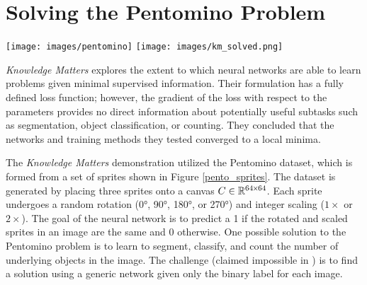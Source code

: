 \section{Solving the Pentomino Problem}

\begin{figure*}[!htb]
  \texttt{[image: images/pentomino]}
  \endminipage\hfill
{}
  \texttt{[image: images/km\_solved.png]}
\endminipage\hfill
\caption{\emph{Left}: The Pentomino sprites and two examples illustrating the $true$ and $false$ classes.
  \emph{Right}: Test accuracy (median and inner quartiles, 10 trials) on the Pentomino problem with and without modern training advances. Note, log-scale of x-axis.}
\label{pento_sprites}
\end{figure*}

{\em Knowledge Matters} \cite{gulccehre2016knowledge} explores the extent to
which neural networks are able to learn problems given minimal
supervised information. Their formulation has a fully defined loss
function; however, the gradient of the loss with respect to the
parameters provides no direct information about potentially useful
subtasks such as segmentation, object classification, or counting. They concluded that the networks and training methods they tested converged to a
local minima.

The {\em Knowledge Matters} demonstration utilized the Pentomino dataset, which
is formed from a set of sprites \cite{gulcehre_2015}
shown in Figure \ref{pento_sprites}. The
dataset is generated by placing three sprites onto a canvas $C \in
\mathbb{R}^{64{\mkern-1.5mu\times\mkern-1.5mu}64}$. Each sprite undergoes a random rotation 
(\ang{0}, \ang{90}, \ang{180}, or \ang{270}) and integer scaling ($1\times$ or $2\times$).  The goal of the
neural network is to predict a 1 if the rotated and scaled sprites in an
image are the same and 0 otherwise. One possible solution to the
Pentomino problem is to learn to segment, classify, and count the number
of underlying objects in the image. The challenge (claimed impossible in \cite{gulcehre_2015})
is to find a solution using a generic network given only the binary
label for each image.

